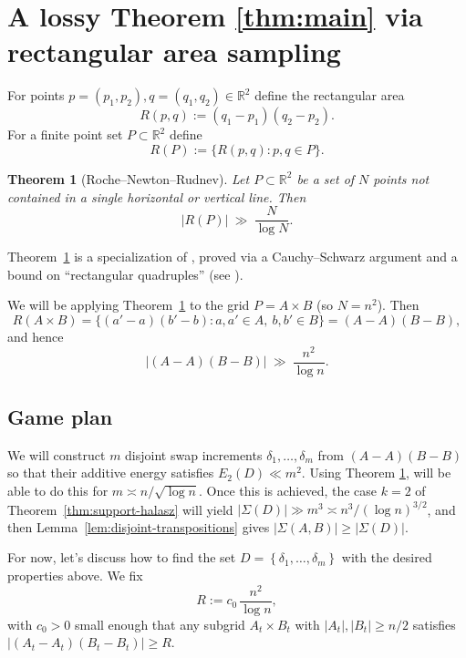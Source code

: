 \documentclass[12pt]{amsart}
\newtheorem{theorem}{Theorem}[section]
\theoremstyle{definition}
\theoremstyle{remark}
\newcommand{\RR}{\mathbb{R}}
\newcommand{\abs}[1]{\left|#1\right|}
\newcommand{\Sig}{\Sigma}
\begin{document}
\section{A lossy Theorem \ref{thm:main} via rectangular area sampling} \label{sec:lossy}

For points $p=(p_1,p_2),q=(q_1,q_2)\in\RR^2$ define the rectangular area
\[
R(p,q):=(q_1-p_1)(q_2-p_2).
\]
For a finite point set $P\subset\RR^2$ define
\[
R(P):=\{R(p,q):p,q\in P\}.
\]

\begin{theorem}[Roche--Newton--Rudnev]\label{thm:RNR}
Let $P\subset\RR^2$ be a set of $N$ points not contained in a single horizontal or vertical line.
Then
\[
\abs{R(P)}\ \gg\ \frac{N}{\log N}.
\]
\end{theorem}

Theorem~\ref{thm:RNR} is a specialization of \cite[Theorem~1$'$]{RNR}, proved via a Cauchy--Schwarz
argument and a bound on ``rectangular quadruples'' (see \cite[Proposition~4]{RNR}).

We will be applying Theorem~\ref{thm:RNR} to the grid $P=A\times B$ (so $N=n^2$). Then
\[
R(A\times B)=\{(a'-a)(b'-b):a,a'\in A,\ b,b'\in B\}=(A-A)(B-B),
\]
and hence
\begin{equation}\label{eq:AA-BB-lower}
\abs{(A-A)(B-B)}\ \gg\ \frac{n^2}{\log n}.
\end{equation}

\medskip
\subsection*{Game plan} We will construct $m$ disjoint swap increments $\delta_1,\dots,\delta_m$ from $(A-A)(B-B)$ so that
their additive energy satisfies $E_2(D)\ll m^2$. Using Theorem \ref{thm:RNR}, will be able to do this for $m \asymp n/\sqrt{\log n}$. Once this is achieved, the case $k=2$ of
Theorem~\ref{thm:support-halasz} will yield $\abs{\Sig(D)}\gg m^3 \asymp n^{3}/(\log n)^{3/2}$, and then
Lemma~\ref{lem:disjoint-transpositions} gives $\abs{\Sig(A,B)}\ge \abs{\Sig(D)}$. 

\smallskip

For now, let's discuss how to find the set $D = \left\{\delta_1,\ldots,\delta_m\right\}$ with the desired properties above. We fix
\begin{equation}\label{eq:def-M}
R := c_0\,\frac{n^2}{\log n},
\end{equation}
with $c_0>0$ small enough that any subgrid $A_t\times B_t$ with $\abs{A_t},\abs{B_t}\ge n/2$ satisfies
\(
\abs{(A_t-A_t)(B_t-B_t)}\ge R.
\)
\end{document}
